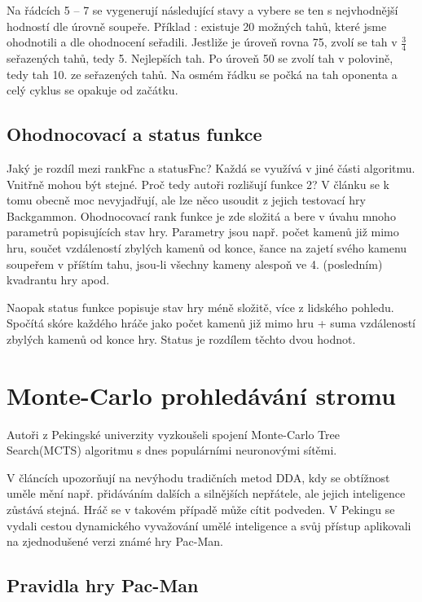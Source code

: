 Na řádcích 5 – 7 se vygenerují následující stavy a vybere se ten s nejvhodnější hodností dle úrovně soupeře. Příklad : existuje 20 možných tahů, které jsme ohodnotili a dle ohodnocení seřadili. Jestliže je úroveň rovna 75, zvolí se tah v $\frac{3}{4}$ seřazených tahů, tedy 5. Nejlepších tah. Po úroveň 50 se zvolí tah v polovině, tedy tah 10. ze seřazených tahů.
Na osmém řádku se počká na tah oponenta a celý cyklus se opakuje od začátku.

\subsection{Ohodnocovací a status funkce}

Jaký je rozdíl mezi rankFnc a statusFnc? Každá se využívá v jiné části algoritmu. Vnitřně mohou být stejné. Proč tedy autoři rozlišují funkce 2? V článku se k tomu obecně moc nevyjadřují, ale lze něco usoudit z jejich testovací hry Backgammon.
Ohodnocovací rank funkce je zde složitá a bere v úvahu mnoho parametrů popisujících stav hry. Parametry jsou např. počet kamenů již mimo hru, součet vzdáleností zbylých kamenů od konce, šance na zajetí svého kamenu soupeřem v příštím tahu, jsou-li všechny kameny alespoň ve 4. (posledním) kvadrantu hry apod.

Naopak status funkce popisuje stav hry méně složitě, více z lidského pohledu. Spočítá skóre každého hráče jako počet kamenů již mimo hru + suma vzdáleností zbylých kamenů od konce hry. Status je rozdílem těchto dvou hodnot.

\section{Monte-Carlo prohledávání stromu} 

Autoři z Pekingské univerzity vyzkoušeli spojení Monte-Carlo Tree Search(MCTS) algoritmu s dnes populárními neuronovými sítěmi. \cite{18Pac1}\cite{19Pac2}

V článcích upozorňují na nevýhodu tradičních metod DDA, kdy se obtížnost uměle mění např. přidáváním dalších a silnějších nepřátele, ale jejich inteligence zůstává stejná. Hráč se v takovém případě může cítit podveden. V Pekingu se vydali cestou dynamického vyvažování umělé inteligence a svůj přístup aplikovali na zjednodušené verzi známé hry Pac-Man.

\subsection{Pravidla hry Pac-Man}

